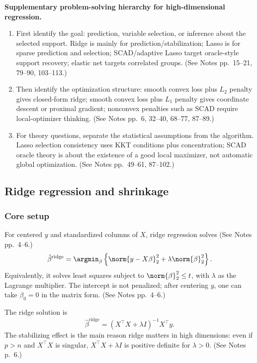 \begin{mybox}
\textbf{Supplementary problem-solving hierarchy for high-dimensional regression.}
\begin{enumerate}
    \item First identify the goal: prediction, variable selection, or inference about the selected support. Ridge is mainly for prediction/stabilization; Lasso is for sparse prediction and selection; SCAD/adaptive Lasso target oracle-style support recovery; elastic net targets correlated groups. (See Notes pp.~15--21, 79--90, 103--113.)
    \item Then identify the optimization structure: smooth convex loss plus $L_2$ penalty gives closed-form ridge; smooth convex loss plus $L_1$ penalty gives coordinate descent or proximal gradient; nonconvex penalties such as SCAD require local-optimizer thinking. (See Notes pp.~6, 32--40, 68--77, 87--89.)
    \item For theory questions, separate the statistical assumptions from the algorithm. Lasso selection consistency uses KKT conditions plus concentration; SCAD oracle theory is about the existence of a good local maximizer, not automatic global optimization. (See Notes pp.~49--61, 87--102.)
\end{enumerate}
\end{mybox}

\subsection{Ridge regression and shrinkage}
\subsubsection{Core setup}
For centered $y$ and standardized columns of $X$, ridge regression solves (See Notes pp.~4--6.)
\[
\hat\beta^{\mathrm{ridge}}
= \argmin_{\beta}
\left\{\norm{y-X\beta}_2^2 + \lambda \norm{\beta}_2^2\right\}.
\]
Equivalently, it solves least squares subject to $\norm{\beta}_2^2 \le t$, with $\lambda$ as the Lagrange multiplier. The intercept is not penalized; after centering $y$, one can take $\beta_0=0$ in the matrix form. (See Notes pp.~4--6.)

The ridge solution is
\[
\hat\beta^{\mathrm{ridge}}
=(X^\top X+\lambda I)^{-1}X^\top y.
\]
The stabilizing effect is the main reason ridge matters in high dimensions: even if $p>n$ and $X^\top X$ is singular, $X^\top X+\lambda I$ is positive definite for $\lambda>0$. (See Notes p.~6.)

